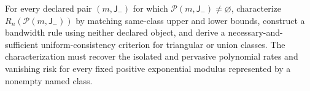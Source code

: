 For every declared pair \((m,\mathsf J_{-})\) for which \(\mathcal P(m,\mathsf J_{-})\ne\varnothing\), characterize \(R_n(\mathcal P(m,\mathsf J_{-}))\) by matching same-class upper and lower bounds, construct a bandwidth rule using neither declared object, and derive a necessary-and-sufficient uniform-consistency criterion for triangular or union classes. The characterization must recover the isolated and pervasive polynomial rates and vanishing risk for every fixed positive exponential modulus represented by a nonempty named class.